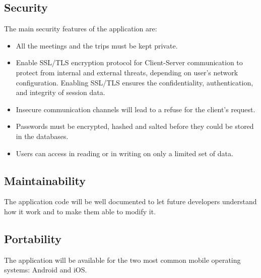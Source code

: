 \subsection{Security}
The main security features of the application are:  
\begin{itemize}
\item All the meetings and the trips must be kept private.
\item Enable SSL/TLS encryption protocol for Client-Server communication to protect from internal and external threats, depending on user’s network configuration. Enabling SSL/TLS ensures the confidentiality, authentication, and integrity of session data.
\item Insecure communication channels will lead to a refuse for the client’s request.
\item Passwords must be encrypted, hashed and salted before they could be stored in the databases.
\item Users can access in reading or in writing on only a limited set of data.
\end{itemize}
%
\subsection{Maintainability}
The application code will be well documented to let future developers understand how it work and to make them able to modify it.
%
\subsection{Portability}
The application will be available for the two most common mobile operating systems: Android and iOS.


